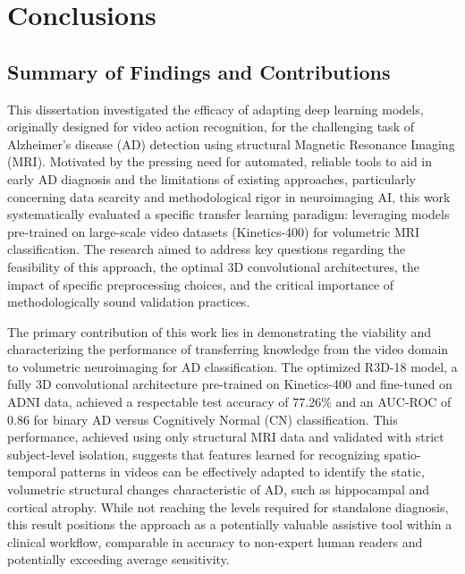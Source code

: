 \documentclass[11pt, a4paper]{article}
\begin{document}
\section{Conclusions}
\label{sec:conclusions}

\subsection{Summary of Findings and Contributions}

This dissertation investigated the efficacy of adapting deep learning models, originally designed for video action recognition, for the challenging task of Alzheimer's disease (AD) detection using structural Magnetic Resonance Imaging (MRI). Motivated by the pressing need for automated, reliable tools to aid in early AD diagnosis and the limitations of existing approaches, particularly concerning data scarcity and methodological rigor in neuroimaging AI, this work systematically evaluated a specific transfer learning paradigm: leveraging models pre-trained on large-scale video datasets (Kinetics-400) for volumetric MRI classification. The research aimed to address key questions regarding the feasibility of this approach, the optimal 3D convolutional architectures, the impact of specific preprocessing choices, and the critical importance of methodologically sound validation practices.

The primary contribution of this work lies in demonstrating the viability and characterizing the performance of transferring knowledge from the video domain to volumetric neuroimaging for AD classification. The optimized R3D-18 model, a fully 3D convolutional architecture pre-trained on Kinetics-400 and fine-tuned on ADNI data, achieved a respectable test accuracy of 77.26\% and an AUC-ROC of 0.86 for binary AD versus Cognitively Normal (CN) classification. This performance, achieved using only structural MRI data and validated with strict subject-level isolation, suggests that features learned for recognizing spatio-temporal patterns in videos can be effectively adapted to identify the static, volumetric structural changes characteristic of AD, such as hippocampal and cortical atrophy. While not reaching the levels required for standalone diagnosis, this result positions the approach as a potentially valuable assistive tool within a clinical workflow, comparable in accuracy to non-expert human readers and potentially exceeding average sensitivity.
\end{document}

